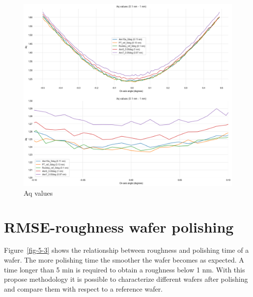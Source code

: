 \documentclass[
  letterpaper,
  DIV=11,
  numbers=noendperiod,
  oneside]{scrreprt}
\begin{document}
\begin{figure}

{\centering \includegraphics{notebooks/d_RMSE_files/figure-pdf/fig-5-2-output-1.png}

}

\caption{\label{fig-5-2}Aq values}

\end{figure}

\hypertarget{rmse-roughness-wafer-polishing}{%
\section{RMSE-roughness wafer
polishing}\label{rmse-roughness-wafer-polishing}}

Figure~\ref{fig-5-3} shows the relationship between roughness and
polishing time of a wafer. The more polishing time the smoother the
wafer becomes as expected. A time longer than 5 min is required to
obtain a roughness below 1 nm. With this propose methodology it is
possible to characterize different wafers after polishing and compare
them with respect to a reference wafer.
\end{document}
